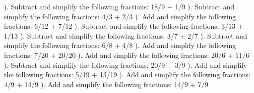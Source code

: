 \documentclass{article}%
\begin{document}
\newline%
\newline%
). Subtract and simplify the following fractions: 18/9 + 1/9%
\newline%
\newline%
). Subtract and simplify the following fractions: 4/3 + 2/3%
\newline%
\newline%
). Add and simplify the following fractions: 6/12 + 7/12%
\newline%
\newline%
). Subtract and simplify the following fractions: 3/13 + 1/13%
\newline%
\newline%
). Subtract and simplify the following fractions: 3/7 + 2/7%
\newline%
\newline%
). Subtract and simplify the following fractions: 6/8 + 4/8%
\newline%
\newline%
). Add and simplify the following fractions: 7/20 + 20/20%
\newline%
\newline%
). Add and simplify the following fractions: 20/6 + 11/6%
\newline%
\newline%
). Subtract and simplify the following fractions: 20/9 + 3/9%
\newline%
\newline%
). Add and simplify the following fractions: 5/19 + 13/19%
\newline%
\newline%
). Add and simplify the following fractions: 4/9 + 14/9%
\newline%
\newline%
). Add and simplify the following fractions: 14/9 + 7/9%
\newline%
\newline%
\end{document}
